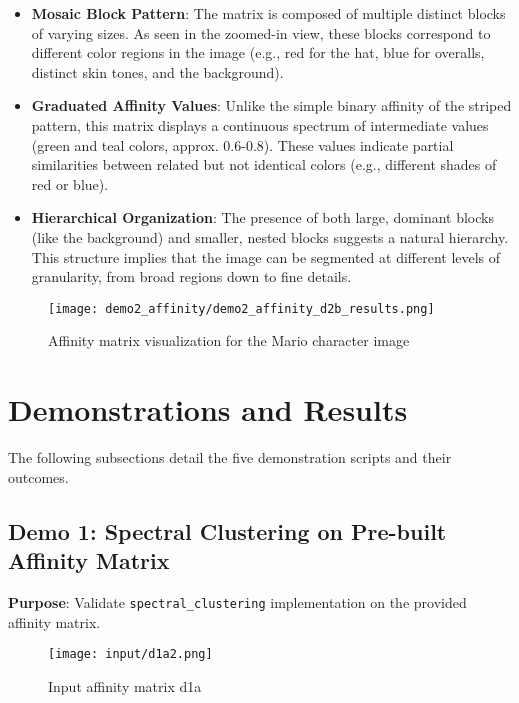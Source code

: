 \documentclass[12pt,a4paper]{article}
\begin{document}
{\begin{itemize}
    \item \textbf{Mosaic Block Pattern}: The matrix is composed of multiple distinct blocks of varying sizes. As seen in the zoomed-in view, these blocks correspond to different color regions in the image (e.g., red for the hat, blue for overalls, distinct skin tones, and the background).
    \item \textbf{Graduated Affinity Values}: Unlike the simple binary affinity of the striped pattern, this matrix displays a continuous spectrum of intermediate values (green and teal colors, approx. 0.6-0.8). These values indicate partial similarities between related but not identical colors (e.g., different shades of red or blue).
    \item \textbf{Hierarchical Organization}: The presence of both large, dominant blocks (like the background) and smaller, nested blocks suggests a natural hierarchy. This structure implies that the image can be segmented at different levels of granularity, from broad regions down to fine details.
\end{itemize}


\begin{figure}[H]
    \centering
    \texttt{[image: demo2\_affinity/demo2\_affinity\_d2b\_results.png]}
    \caption{Affinity matrix visualization for the Mario character image}
    \label{fig:affinity_matrix_mario}
\end{figure}



\newpage


\section{Demonstrations and Results}
The following subsections detail the five demonstration scripts and their outcomes.

\subsection{Demo 1: Spectral Clustering on Pre-built Affinity Matrix}
\textbf{Purpose}: Validate \texttt{spectral\_clustering} implementation on the provided affinity matrix.

\begin{figure}[H]
    \centering
    \texttt{[image: input/d1a2.png]}
    \caption{Input affinity matrix d1a}
    \label{fig:demo1}
\end{figure}

}
\end{document}
